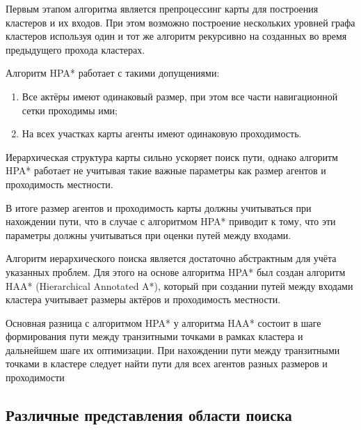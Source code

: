 Первым этапом алгоритма является препроцессинг карты для построения кластеров и их входов. При этом возможно построение нескольких уровней графа кластеров используя один и тот же алгоритм рекурсивно на созданных во время предыдущего прохода кластерах.

%

Алгоритм HPA* работает с такими допущениями:

\begin{enumerate}
    \item Все актёры имеют одинаковый размер, при этом все части навигационной сетки проходимы ими;
    \item На всех участках карты агенты имеют одинаковую проходимость.
\end{enumerate}

Иерархическая структура карты сильно ускоряет поиск пути, однако алгоритм HPA* работает не учитывая такие важные параметры как размер агентов и проходимость местности.  

В итоге размер агентов и проходимость карты должны учитываться при нахождении пути, что в случае с алгоритмом HPA* приводит к тому, что эти параметры должны учитываться при оценки путей между входами.

Алгоритм иерархического поиска является достаточно абстрактным для учёта указанных проблем. Для этого на основе алгоритма HPA* был создан алгоритм HAA* (Hierarchical Annotated A*), который при создании путей между входами кластера учитывает размеры актёров и проходимость местности.

Основная разница с алгоритмом HPA* у алгоритма HAA* состоит в шаге формирования пути между транзитными точками в рамках кластера и дальнейшем шаге их оптимизации. При нахождении пути между транзитными точками в кластере следует найти пути для всех агентов разных размеров и проходимости 

%

\subsection{Различные представления области поиска}

